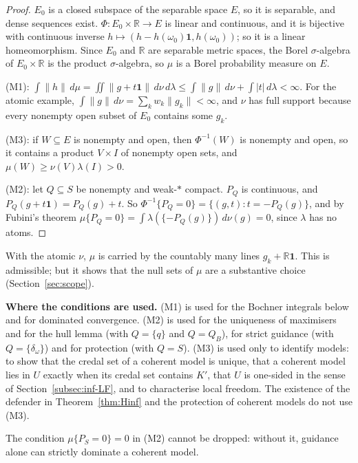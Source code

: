 \documentclass[11pt]{article}
\newcommand{\R}{\mathbb{R}}
\newcommand{\one}{\mathbf{1}}
\theoremstyle{plain}
\theoremstyle{definition}
\theoremstyle{remark}
\begin{document}
\begin{proof}
$E_0$ is a closed subspace of the separable space $E$, so it is separable, and dense
sequences exist. $\Phi:E_0\times\R\to E$ is linear and continuous, and it is bijective
with continuous inverse $h\mapsto(h-h(\omega_0)\one,h(\omega_0))$; so it is a linear
homeomorphism. Since $E_0$ and $\R$ are separable metric spaces, the Borel
$\sigma$-algebra of $E_0\times\R$ is the product $\sigma$-algebra, so $\mu$ is a Borel
probability measure on $E$.

(M1): $\int\|h\|\,d\mu=\iint\|g+t\one\|\,d\nu\,d\lambda\le\int\|g\|\,d\nu+\int|t|\,
d\lambda<\infty$. For the atomic example, $\int\|g\|\,d\nu=\sum_kw_k\|g_k\|<\infty$, and
$\nu$ has full support because every nonempty open subset of $E_0$ contains some $g_k$.

(M3): if $W\subseteq E$ is nonempty and open, then $\Phi^{-1}(W)$ is nonempty and open,
so it contains a product $V\times I$ of nonempty open sets, and $\mu(W)\ge\nu(V)\lambda(I)
>0$.

(M2): let $Q\subseteq S$ be nonempty and weak-$\ast$ compact. $P_Q$ is continuous, and
$P_Q(g+t\one)=P_Q(g)+t$. So $\Phi^{-1}\{P_Q=0\}=\{(g,t):t=-P_Q(g)\}$, and by Fubini's
theorem $\mu\{P_Q=0\}=\int\lambda(\{-P_Q(g)\})\,d\nu(g)=0$, since $\lambda$ has no atoms.
\end{proof}

With the atomic $\nu$, $\mu$ is carried by the countably many lines $g_k+\R\one$. This is
admissible; but it shows that the null sets of $\mu$ are a substantive choice
(Section~\ref{sec:scope}).

\smallskip\noindent\textbf{Where the conditions are used.} (M1) is used for the Bochner
integrals below and for dominated convergence. (M2) is used for the uniqueness of
maximisers and for the hull lemma (with $Q=\{q\}$ and $Q=Q_B$), for strict guidance (with
$Q=\{\delta_\omega\}$) and for protection (with $Q=S$). (M3) is used only to identify
models: to show that the credal set of a coherent model is unique, that a coherent model
lies in $U$ exactly when its credal set contains $K'$, that $U$ is one-sided in the sense
of Section~\ref{subsec:inf-LF}, and to characterise local freedom.
The existence of the defender in Theorem~\ref{thm:Hinf} and the protection of coherent
models do not use (M3).

\smallskip
The condition $\mu\{P_S=0\}=0$ in (M2) cannot be dropped: without it, guidance alone can
strictly dominate a coherent model.
\end{document}
